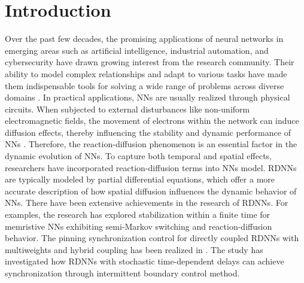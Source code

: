 \documentclass[preprint,review,fleqn,sort&compress,3p]{elsarticle}
\theoremstyle{definition}%
\begin{document}
\section{Introduction}
\label{sec1}
	Over the past few decades, the promising applications of neural networks in emerging areas such as artificial intelligence, industrial automation, and cybersecurity have drawn growing interest from the research community. Their ability to model complex relationships and adapt to various tasks have made them indispensable tools for solving a wide range of problems across diverse domains \cite{guo2024nonfragileb,li2024resilientb,sang2019exponential}. In practical applications, NNs are usually realized through physical circuits. When subjected to external disturbances like non-uniform electromagnetic fields, the movement of electrons within the network can induce diffusion effects, thereby influencing the stability and dynamic performance of NNs \cite{wang2024fuzzya}. Therefore, the reaction-diffusion phenomenon is an essential factor in the dynamic evolution of NNs. To capture both temporal and spatial effects, researchers have incorporated reaction-diffusion terms into NNs model. RDNNs are typically modeled by partial differential equations, which offer a more accurate description of how spatial diffusion influences the dynamic behavior of NNs. There have been extensive achievements in the research of RDNNs. For examples, the research \cite{zhang2025finitetimea} has explored stabilization within a finite time for memristive NNs exhibiting semi-Markov switching and reaction-diffusion behavior. The pinning synchronization control for directly coupled RDNNs with multiweights and hybrid coupling  has been realized in \cite{lin2023synchronization}.  The study \cite{wang2023synchronization} has investigated how RDNNs with stochastic time-dependent delays can achieve synchronization through intermittent boundary control method.
	
\end{document}
